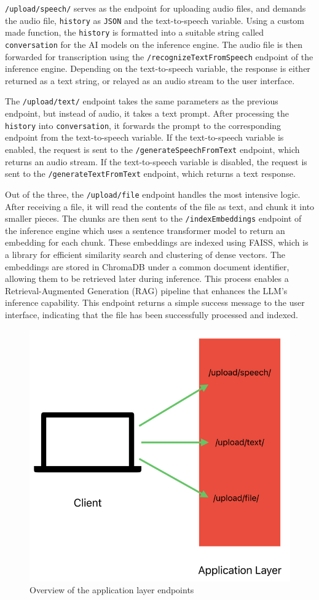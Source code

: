 \documentclass[twocolumn]{article}
\begin{document}
\verb|/upload/speech/| serves as the endpoint for uploading audio files, and demands the audio file, \verb|history| as \verb|JSON| and the text-to-speech variable. Using a custom made function, the \verb|history| is formatted into a suitable string called \verb|conversation| for the AI models on the inference engine. The audio file is then forwarded for transcription using the \verb|/recognizeTextFromSpeech| endpoint of the inference engine. Depending on the text-to-speech variable, the response is either returned as a text string, or relayed as an audio stream to the user interface.

The \verb|/upload/text/| endpoint takes the same parameters as the previous endpoint, but instead of audio, it takes a text prompt. After processing the \verb|history| into \verb|conversation|, it forwards the prompt to the corresponding endpoint from the text-to-speech variable. If the text-to-speech variable is enabled, the request is sent to the \verb|/generateSpeechFromText| endpoint, which returns an audio stream. If the text-to-speech variable is disabled, the request is sent to the \verb|/generateTextFromText| endpoint, which returns a text response.

Out of the three, the \verb|/upload/file| endpoint handles the most intensive logic. After receiving a file, it will read the contents of the file as text, and chunk it into smaller pieces. The chunks are then sent to the \verb|/indexEmbeddings| endpoint of the inference engine which uses a sentence transformer model to return an embedding for each chunk. These embeddings are indexed using FAISS, which is a library for efficient similarity search and clustering of dense vectors. The embeddings are stored in ChromaDB\cite{chromadb2023} under a common document identifier, allowing them to be retrieved later during inference. This process enables a Retrieval-Augmented Generation (RAG) pipeline that enhances the LLM's inference capability. This endpoint returns a simple success message to the user interface, indicating that the file has been successfully processed and indexed.

\begin{figure}[H]
    \centering
    \includegraphics[width=0.75\linewidth]{imgs/applayer.png}
    \caption{Overview of the application layer endpoints}
    \label{fig:applayer}
\end{figure}
\end{document}
